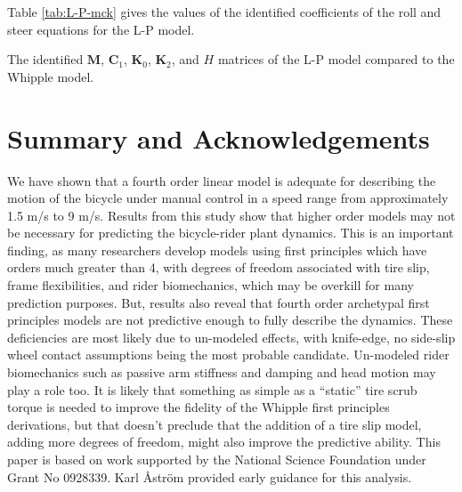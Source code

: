 \documentclass[a4paper]{article}
\begin{document}
Table \ref{tab:L-P-mck} gives the values of the identified coefficients of the
roll and steer equations for the L-P model.

\begin{table}
  \label{tab:L-P-mck}
  \centering
  \caption{The identified $\mathbf{M}$, $\mathbf{C}_1$, $\mathbf{K}_0$,
    $\mathbf{K}_2$, and $H$ matrices of the L-P model compared to the  Whipple
    model.}
  \small
  
\end{table}

\section*{Summary and Acknowledgements}

We have shown that a fourth order linear model is adequate for describing the
motion of the bicycle under manual control in a speed range from approximately
1.5 m/s to 9 m/s. Results from this study show that higher order models may
not be necessary for predicting the bicycle-rider plant dynamics. This is an
important finding, as many researchers develop models using first principles
which have orders much greater than 4, with degrees of freedom associated with
tire slip, frame flexibilities, and rider biomechanics, which may be overkill
for many prediction purposes. But, results also reveal that fourth order
archetypal first principles models are not predictive enough to fully describe
the dynamics. These deficiencies are most likely due to un-modeled effects,
with knife-edge, no side-slip wheel contact assumptions being the most probable
candidate. Un-modeled rider biomechanics such as passive arm stiffness and
damping and head motion may play a role too. It is likely that something as
simple as a ``static'' tire scrub torque is needed to improve the fidelity of
the Whipple first principles derivations, but that doesn't preclude that the
addition of a tire slip model, adding more degrees of freedom, might also
improve the predictive ability. This paper is based on work supported by the
National Science Foundation under Grant No 0928339. Karl {\AA}str{\"o}m
provided early guidance for this analysis.



\end{document}
